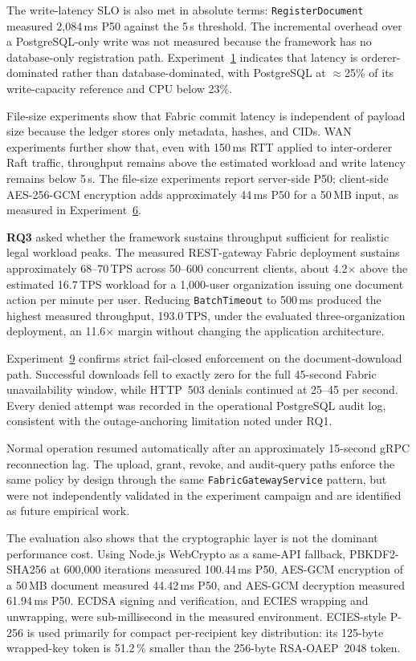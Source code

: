 \documentclass{ieeeaccess}
\begin{document}
The write-latency \textsc{SLO} is also met in absolute terms:
\texttt{RegisterDocument} measured 2{,}084\,ms P50 against the 5\,s threshold.
The incremental overhead over a PostgreSQL-only write was not measured
because the framework has no database-only registration path.
Experiment~\hyperref[sec:exp_scalability]{1} indicates that latency is
orderer-dominated rather than database-dominated, with PostgreSQL at
$\approx$25\% of its write-capacity reference and CPU below 23\%.

File-size experiments show that Fabric commit latency is independent of
payload size because the ledger stores only metadata, hashes, and CIDs. WAN
experiments further show that, even with 150\,ms RTT applied to inter-orderer
Raft traffic, throughput remains above the estimated workload and write
latency remains below 5\,s. The file-size experiments report server-side P50;
client-side AES-256-GCM encryption adds approximately 44\,ms P50 for a 50\,MB
input, as measured in Experiment~\hyperref[sec:exp_crypto]{6}.

\textbf{RQ3} asked whether the framework sustains throughput sufficient for
realistic legal workload peaks. The measured REST-gateway Fabric deployment
sustains approximately 68--70\,TPS across 50--600 concurrent clients, about
4.2$\times$ above the estimated 16.7\,TPS workload for a 1,000-user
organization issuing one document action per minute per user. Reducing
\texttt{BatchTimeout} to 500\,ms produced the highest measured throughput,
193.0\,TPS, under the evaluated three-organization deployment, an
11.6$\times$ margin without changing the application architecture.

Experiment~\hyperref[sec:exp_failclosed]{9} confirms strict fail-closed
enforcement on the document-download path. Successful downloads fell to
exactly zero for the full 45-second Fabric unavailability window, while
HTTP~503 denials continued at 25--45 per second. Every denied attempt was
recorded in the operational \mbox{PostgreSQL} audit log, consistent with the
outage-anchoring limitation noted under RQ1.

Normal operation resumed automatically after an approximately 15-second gRPC
reconnection lag. The upload, grant, revoke, and audit-query paths enforce the
same policy by design through the same \texttt{FabricGatewayService} pattern,
but were not independently validated in the experiment campaign and are
identified as future empirical work.

The evaluation also shows that the cryptographic layer is not the dominant
performance cost. Using Node.js WebCrypto as a same-API fallback,
PBKDF2-SHA256 at 600,000 iterations measured 100.44\,ms P50, AES-GCM
encryption of a 50\,MB document measured 44.42\,ms P50, and AES-GCM
decryption measured 61.94\,ms P50. ECDSA signing and verification, and ECIES
wrapping and unwrapping, were sub-millisecond in the measured environment.
ECIES-style P-256 is used primarily for compact per-recipient key
distribution: its 125-byte wrapped-key token is 51.2\,\% smaller than the
256-byte RSA-OAEP~2048 token.
\end{document}
